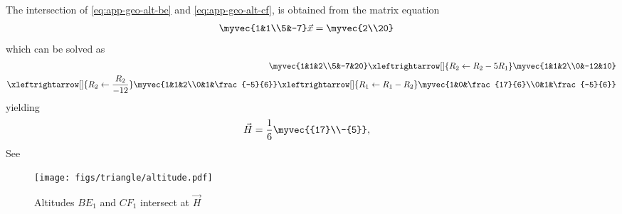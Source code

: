 \\ \solution
%
The intersection of 
		\eqref{eq:app-geo-alt-be}
		and
		\eqref{eq:app-geo-alt-cf},
		is obtained from 
		the matrix equation
\begin{align}
        \myvec{1&1\\5&-7} \vec{x} &= \myvec{2\\20}
\end{align}
%
which can be solved as 
%
\begin{align}
        \myvec{1&1&2\\5&-7&20}
	 \xleftrightarrow[]{R_2 \leftarrow R_2 - 5R_1}
        \myvec{1&1&2\\0&-12&10}\\
	 \xleftrightarrow[]{R_2 \leftarrow \frac{R_2}{-12}}
        \myvec{1&1&2\\0&1&\frac{-5}{6}}
	 \xleftrightarrow[]{R_1 \leftarrow R_1 - R_2}
        \myvec{1&0&\frac{17}{6}\\0&1&\frac{-5}{6}}
\end{align}
%
yielding
%
\begin{align}
        \vec{H}&=\frac{1}{6}\myvec{{17}\\-{5}}
		\label{eq:app-geo-alt-H},
\end{align}
%
See 
\begin{figure}[H]
\centering
\texttt{[image: figs/triangle/altitude.pdf]}
\caption{Altitudes $BE_1$ and $CF_1$ intersect at $\vec{H}$}
\label{fig:m_tri_py}
\end{figure}

